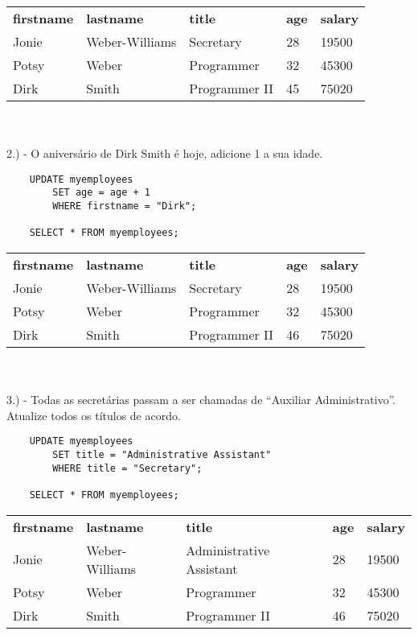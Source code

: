 \begin{tabular}{l l l l l}
    {\textbf{firstname}} & {\textbf{lastname}} & {\textbf{title}} & {\textbf{age}} & {\textbf{salary}} \\
    {Jonie}              & {Weber-Williams}    & {Secretary}      & {28}           & {19500}           \\
    {Potsy}              & {Weber}             & {Programmer}     & {32}           & {45300}           \\
    {Dirk}               & {Smith}             & {Programmer II}  & {45}           & {75020}          
\end{tabular} \\ \\ 

2.) - O aniversário de Dirk Smith é hoje, adicione 1 a sua idade.

\begin{lstlisting}
    UPDATE myemployees 
	    SET age = age + 1 
	    WHERE firstname = "Dirk";

    SELECT * FROM myemployees;
\end{lstlisting}

\begin{tabular}{l l l l l}
    {\textbf{firstname}} & {\textbf{lastname}} & {\textbf{title}} & {\textbf{age}} & {\textbf{salary}} \\
    {Jonie}              & {Weber-Williams}    & {Secretary}      & {28}           & {19500}           \\
    {Potsy}              & {Weber}             & {Programmer}     & {32}           & {45300}           \\
    {Dirk}               & {Smith}             & {Programmer II}  & {46}           & {75020}          
\end{tabular} \\ \\

3.) - Todas as secretárias passam a ser chamadas de “Auxiliar Administrativo”. Atualize todos os títulos de acordo.

\begin{lstlisting}
    UPDATE myemployees 
	    SET title = "Administrative Assistant" 
	    WHERE title = "Secretary";

    SELECT * FROM myemployees;
\end{lstlisting}

\begin{tabular}{l l l l l}
    {\textbf{firstname}} & {\textbf{lastname}} & {\textbf{title}} & {\textbf{age}} & {\textbf{salary}} \\
    {Jonie}              & {Weber-Williams}    & {Administrative Assistant}      & {28}           & {19500}           \\
    {Potsy}              & {Weber}             & {Programmer}     & {32}           & {45300}           \\
    {Dirk}               & {Smith}             & {Programmer II}  & {46}           & {75020}          
\end{tabular} \\ \\

